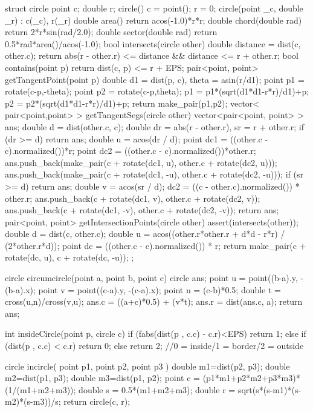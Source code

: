 \documentclass[11pt]{article}
\begin{document}
\begin{vncode}
struct circle {
	point c;
	double r;
	circle() { c = point(); r = 0; }
	circle(point _c, double _r) : c(_c), r(_r) {}
	double area() { return acos(-1.0)*r*r; }
	double chord(double rad) { return  2*r*sin(rad/2.0); }
	double sector(double rad) { return 0.5*rad*area()/acos(-1.0); }
	bool intersects(circle other) {
		double distance = dist(c, other.c);
		return abs(r - other.r) <= distance && distance <= r + other.r;
	}
	bool contains(point p) { return dist(c, p) <= r + EPS; }
	pair<point, point> getTangentPoint(point p) {
		double d1 = dist(p, c), theta = asin(r/d1);
		point p1 = rotate(c-p,-theta);
		point p2 = rotate(c-p,theta);
		p1 = p1*(sqrt(d1*d1-r*r)/d1)+p;
		p2 = p2*(sqrt(d1*d1-r*r)/d1)+p;
		return make_pair(p1,p2);
	}
	vector< pair<point,point> > getTangentSegs(circle other) {
		vector<pair<point, point> > ans;
		double d = dist(other.c, c);
		double dr = abs(r - other.r), sr = r + other.r;
		if (dr >= d) return ans;
		double u = acos(dr / d);
		point dc1 = ((other.c - c).normalized())*r;
		point dc2 = ((other.c - c).normalized())*other.r;
		ans.push_back(make_pair(c + rotate(dc1, u), other.c + rotate(dc2, u)));
		ans.push_back(make_pair(c + rotate(dc1, -u), other.c + rotate(dc2, -u)));
		if (sr >= d) return ans;
		double v = acos(sr / d);
		dc2 = ((c - other.c).normalized()) * other.r;
		ans.push_back({c + rotate(dc1, v), other.c + rotate(dc2, v)});
		ans.push_back({c + rotate(dc1, -v), other.c + rotate(dc2, -v)});
		return ans;
	}
	pair<point, point> getIntersectionPoints(circle other){
		assert(intersects(other));
		double d = dist(c, other.c);
		double u = acos((other.r*other.r + d*d - r*r) / (2*other.r*d));
		point dc = ((other.c - c).normalized()) * r;
		return make_pair(c + rotate(dc, u), c + rotate(dc, -u));
	}
};

circle circumcircle(point a, point b, point c) {
	circle ans;
	point u = point((b-a).y, -(b-a).x);
	point v = point((c-a).y, -(c-a).x);
	point n = (c-b)*0.5;
	double t = cross(u,n)/cross(v,u);
	ans.c = ((a+c)*0.5) + (v*t);
	ans.r = dist(ans.c, a);
	return ans;
}

int insideCircle(point p, circle c) {
	if (fabs(dist(p , c.c) - c.r)<EPS) return 1;
	else if (dist(p , c.c) < c.r) return 0;
	else return 2;
} //0 = inside/1 = border/2 = outside

circle incircle( point p1, point p2, point p3 ) {
    double m1=dist(p2, p3);
    double m2=dist(p1, p3);
    double m3=dist(p1, p2);
    point c = (p1*m1+p2*m2+p3*m3)*(1/(m1+m2+m3));
    double s = 0.5*(m1+m2+m3);
    double r = sqrt(s*(s-m1)*(s-m2)*(s-m3))/s;
    return circle(c, r);
}


\end{vncode}
\end{document}
